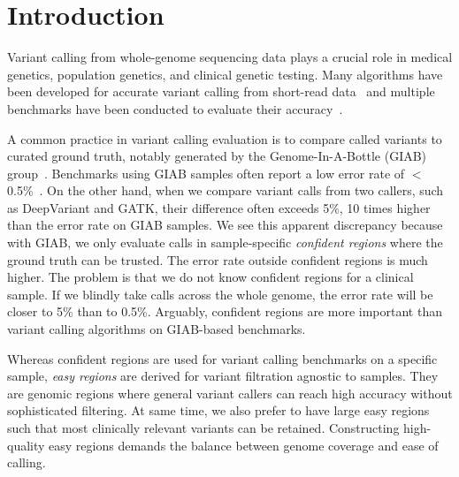 \documentclass[webpdf,contemporary,large,namedate]{oup-authoring-template}%
\begin{document}
\maketitle

\section{Introduction}

Variant calling from whole-genome sequencing data plays a crucial role in medical genetics,
population genetics, and clinical genetic testing.
Many algorithms have been developed for accurate variant calling from short-read data~\citep{Depristo:2011vn,Kim:2018aa,Poplin:2018ab,Cooke:2021ab}
and multiple benchmarks have been conducted to evaluate their accuracy~\citep{Zook:2014ab,Li:2018aa}.

A common practice in variant calling evaluation is to compare called variants to curated ground truth,
notably generated by the Genome-In-A-Bottle (GIAB) group~\citep{Zook:2014ab}.
Benchmarks using GIAB samples often report a low error rate of $<$0.5\%~\citep{Olson:2022aa}.
On the other hand, when we compare variant calls from two callers, such as DeepVariant and GATK,
their difference often exceeds 5\%, 10 times higher than the error rate on GIAB samples.
We see this apparent discrepancy because with GIAB, we only evaluate calls in sample-specific \emph{confident regions}
where the ground truth can be trusted.
The error rate outside confident regions is much higher.
The problem is that we do not know confident regions for a clinical sample.
If we blindly take calls across the whole genome,
the error rate will be closer to 5\% than to 0.5\%.
Arguably, confident regions are more important than variant calling algorithms on GIAB-based benchmarks.

Whereas confident regions are used for variant calling benchmarks on a specific sample,
\emph{easy regions} are derived for variant filtration agnostic to samples.
They are genomic regions where general variant callers can reach high accuracy without sophisticated filtering.
At same time, we also prefer to have large easy regions such that most clinically relevant variants can be retained.
Constructing high-quality easy regions demands the balance between genome coverage and ease of calling.
\end{document}
